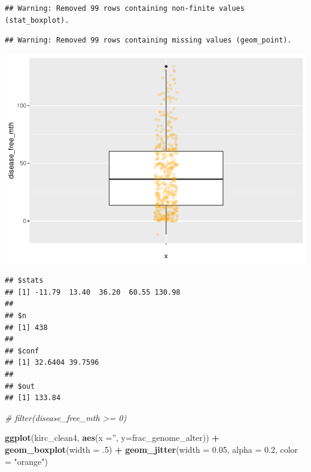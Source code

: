 \documentclass[]{article}
\newenvironment{Shaded}{\begin{snugshade}}{\end{snugshade}}
\newcommand{\KeywordTok}[1]{\textcolor[rgb]{0.13,0.29,0.53}{\textbf{#1}}}
\newcommand{\DataTypeTok}[1]{\textcolor[rgb]{0.13,0.29,0.53}{#1}}
\newcommand{\DecValTok}[1]{\textcolor[rgb]{0.00,0.00,0.81}{#1}}
\newcommand{\FloatTok}[1]{\textcolor[rgb]{0.00,0.00,0.81}{#1}}
\newcommand{\StringTok}[1]{\textcolor[rgb]{0.31,0.60,0.02}{#1}}
\newcommand{\CommentTok}[1]{\textcolor[rgb]{0.56,0.35,0.01}{\textit{#1}}}
\newcommand{\OperatorTok}[1]{\textcolor[rgb]{0.81,0.36,0.00}{\textbf{#1}}}
\newcommand{\NormalTok}[1]{#1}
\begin{document}
\begin{verbatim}
## Warning: Removed 99 rows containing non-finite values (stat_boxplot).
\end{verbatim}

\begin{verbatim}
## Warning: Removed 99 rows containing missing values (geom_point).
\end{verbatim}

\includegraphics{figs/render-unnamed-chunk-17-1.pdf}

\begin{Shaded}
\end{Shaded}

\begin{verbatim}
## $stats
## [1] -11.79  13.40  36.20  60.55 130.98
## 
## $n
## [1] 438
## 
## $conf
## [1] 32.6404 39.7596
## 
## $out
## [1] 133.84
\end{verbatim}

\begin{Shaded}
\begin{Highlighting}[]
\CommentTok{# filter(disease_free_mth >= 0) }
\end{Highlighting}
\end{Shaded}

\begin{Shaded}
\begin{Highlighting}[]
\KeywordTok{ggplot}\NormalTok{(kirc_clean4, }\KeywordTok{aes}\NormalTok{(}\DataTypeTok{x =}\StringTok{''}\NormalTok{, }\DataTypeTok{y=}\NormalTok{frac_genome_alter)) }\OperatorTok{+}
\StringTok{     }\KeywordTok{geom_boxplot}\NormalTok{(}\DataTypeTok{width =}\NormalTok{ .}\DecValTok{5}\NormalTok{) }\OperatorTok{+}
\StringTok{     }\KeywordTok{geom_jitter}\NormalTok{(}\DataTypeTok{width =} \FloatTok{0.05}\NormalTok{, }\DataTypeTok{alpha =} \FloatTok{0.2}\NormalTok{, }\DataTypeTok{color =} \StringTok{"orange"}\NormalTok{)}
\end{Highlighting}
\end{Shaded}
\end{document}
